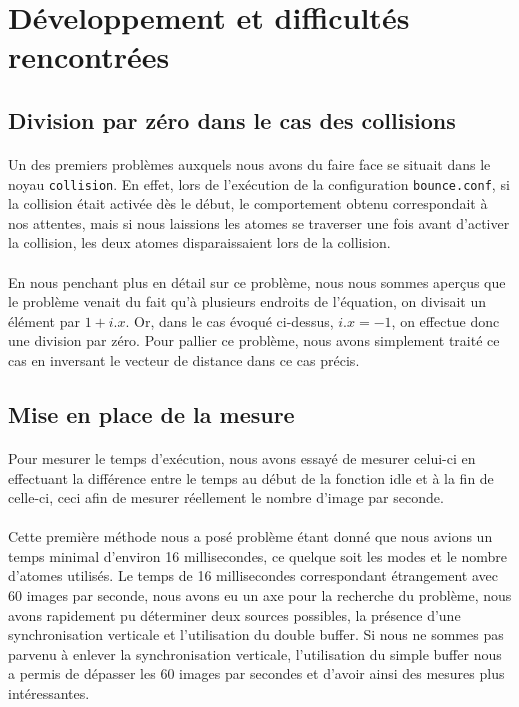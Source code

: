 \documentclass{article}
\begin{document}
\section{Développement et difficultés rencontrées}

\subsection{Division par zéro dans le cas des collisions}

\paragraph{}
Un des premiers problèmes auxquels nous avons du faire face se situait dans le
noyau \verb!collision!. En effet, lors de l'exécution de la configuration
\verb!bounce.conf!, si la collision était activée dès le début, le
comportement obtenu correspondait à nos attentes, mais si nous laissions les
atomes se traverser une fois avant d'activer la collision, les deux atomes
disparaissaient lors de la collision.

\paragraph{}
En nous penchant plus en détail sur ce problème, nous nous sommes aperçus que le
problème venait du fait qu'à plusieurs endroits de l'équation, on divisait un
élément par $1 + i.x$. Or, dans le cas évoqué ci-dessus, $i.x = -1$, on effectue
donc une division par zéro. Pour pallier ce problème, nous avons simplement
traité ce cas en inversant le vecteur de distance dans ce cas précis.

\subsection{Mise en place de la mesure}
\paragraph{}
Pour mesurer le temps d'exécution, nous avons essayé de mesurer celui-ci en
effectuant la différence entre le temps au début de la fonction idle et à la
fin de celle-ci, ceci afin de mesurer réellement le nombre d'image par seconde.
\paragraph{}
Cette première méthode nous a posé problème étant donné que nous avions un temps
minimal d'environ 16 millisecondes, ce quelque soit les modes et le nombre
d'atomes utilisés. Le temps de 16 millisecondes correspondant étrangement avec
60 images par seconde, nous avons eu un axe pour la recherche du problème, nous
avons rapidement pu déterminer deux sources possibles, la présence d'une
synchronisation verticale et l'utilisation du double buffer. Si nous ne sommes
pas parvenu à enlever la synchronisation verticale, l'utilisation du simple
buffer nous a permis de dépasser les 60 images par secondes et d'avoir ainsi des
mesures plus intéressantes.
\end{document}
